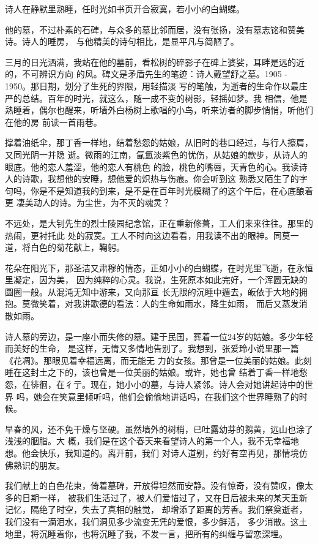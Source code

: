 	\endwriting



		诗人在静默里熟睡，任时光如书页开合寂寞，若小小的白蝴蝶。

		他的墓，不过朴素的石碑，与众多的墓比邻而居，没有张扬，没有墓志铭和赞美诗。诗人的睡房，
	与他精美的诗句相比，是显平凡与简陋了。


		三月的日光洒满，我站在他的墓前，看松树的碎影子在碑上婆娑，耳畔是远的近的，不可辨识方向
	的风。碑文是矛盾先生的笔迹：诗人戴望舒之墓。1905 - 1950。那日期，划分了生死的界限，用轻描淡
	写的笔触，为逝者的生命作以最庄严的总结。百年的时光，就这么，随一成不变的树影，轻摇如梦。我
	相信，他是熟睡着，偶尔也醒来，听墙外白杨树上歌唱的小鸟，听来访者的脚步悄悄，听他们在他的房
	前读一首雨巷。


		撑着油纸伞，那丁香一样地，结着愁怨的姑娘，从旧时的巷口经过，与行人擦肩，又同光阴一并隐
	逝。微雨的江南，氤氲淡紫色的忧伤，从姑娘的款步，从诗人的眼底。他的恋人羞涩，他的恋人有桃色
	的脸，桃色的嘴唇，天青色的心。我读诗人的诗歌，我想他的安睡，想他爱的炽热与伤痕。你会听到这
	熟悉又陌生了的字句吗，你是不是知道我的到来，是不是在百年时光模糊了的这个午后，在心底酿着更
	凄美动人的诗。为尘世，为不灭的魂灵？


		不远处，是大钊先生的烈士陵园纪念馆，正在重新修葺，工人们来来往往。那里的热闹，更衬托此
	处的寂寞。工人不时向这边看看，用我读不出的眼神。同莫一道，将白色的菊花献上，鞠躬。


		花朵在阳光下，那圣洁又肃穆的情态，正如小小的白蝴蝶，在时光里飞逝，在永恒里凝定，因为美，
	因为纯粹的心灵。我说，生死原本如此完好，一个浑圆无缺的圆圈一般。从混沌无知中游来，又向那亘
	长无限的沉睡中遁去，皈依于大地的拥抱。莫微笑着，对我讲歌德的看法：人的生命如雨水，降生如雨，
	而后又蒸发消散如雨。


		诗人墓的旁边，是一座小而失修的墓。建于民国，葬着一位24岁的姑娘。多少年轻而美好的生命，
	是这样，无情又多情地告别了。我想到，张爱玲小说里那一篇《花凋》。那眼见着幸福远离，而无能无
	力的女孩。那曾是一位美丽的姑娘。此刻睡在这封土之下的，该也曾是一位美丽的姑娘。或许，她也曾
	结着丁香一样地愁怨，在徘徊，在彳亍。现在，她小小的墓，与诗人紧邻。诗人会对她讲起诗中的世界
	吗，她会在笑意里倾听吗，他们会偷偷地讲话吗，在我们这个世界睡熟了的时候。


		早春的风，还不免干燥与坚硬。虽然墙外的树梢，已吐露幼芽的鹅黄，远山也涂了浅浅的胭脂。大
	概，我们是在这个春天来看望诗人的第一个人，我不无幸福地想。他会快乐，我知道的。离开前，我们
	对诗人道别，约好有空再见，那情境仿佛熟识的朋友。


		我们献上的白色花束，倚着墓碑，开放得坦然而安静。没有惊奇，没有赞叹，像太多的日期一样，
	被我们生活过了，被人们爱惜过了，又在日后被未来的某天重新记忆，隔绝了时空，失去了真相的触觉，
	却增添了距离的芳香。我们祭奠逝者，我们没有一滴泪水，我们洞见多少流变无凭的爱恨，多少鲜活，
	多少消散。这土地里，将沉睡着你，也将沉睡了我，不发一言，把所有的纠缠与留恋深埋。


